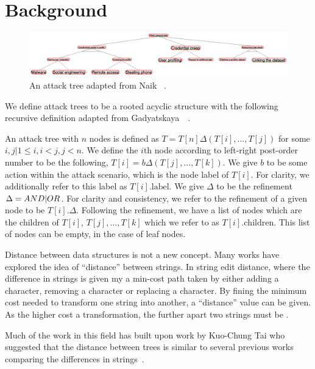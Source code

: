 \section{Background}
\label{sec:background}

\begin{figure}
    \includegraphics[width=\linewidth]{img/TargetAT.png}
    \caption{An attack tree adapted from Naik \etal~\cite{naikEvaluationPotentialAttack2022}. }
    \label{fig:tartgetAT}
\end{figure}

We define attack trees to be a rooted acyclic structure with the following recursive definition adapted from Gadyatskaya~\etal~\cite{gadyatskayaRefinementAwareGenerationAttack2017}. 

\begin{definition} \label{def:attack-tree} An attack tree with $n$ nodes is defined as $T = T[n]\Delta(T[i],...,T[j])$ for some $i,j|1 \le i, i < j, j < n$. We define the $i\text{th}$ node according to left-right post-order number to be the following, $T[i] = b\Delta(T[j],...,T[k])$. We give $b$ to be some action within the attack scenario, which is the node label of $T[i]$. For clarity, we additionally refer to this label as $T[i].\text{label}$. We give $\Delta$ to be the refinement $\Delta = AND|OR$. For clarity and consistency, we refer to the refinement of a given node to be $T[i].\Delta$. Following the refinement, we have a list of nodes which are the children of $T[i]$, $T[j],...,T[k]$ which we refer to as $T[i].\text{children}$. This list of nodes can be empty, in the case of leaf nodes.
\end{definition}
      

Distance between data structures is not a new concept. Many works have explored the idea of ``distance'' between strings. In string edit distance, where the difference in strings is given my a min-cost path taken by either adding a character, removing a character or replacing a character. By fining the minimum cost needed to transform one string into another, a ``distance'' value can be given. As the higher cost a transformation, the further apart two strings must be .

Much of the work in this field has built upon work by Kuo-Chung Tai who suggested that the distance between trees is similar to several previous works comparing the differences in strings~\cite{tai_tree--tree_nodate}.


